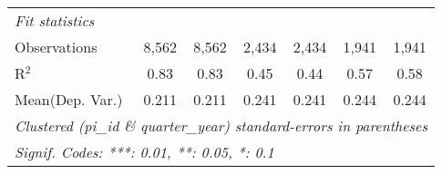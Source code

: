 \begin{tabular}{lcccccc}
   \emph{Fit statistics}\\
   Observations                                                & 8,562         & 8,562         & 2,434         & 2,434         & 1,941        & 1,941\\  
   R$^2$                                                       & 0.83          & 0.83          & 0.45          & 0.44          & 0.57         & 0.58\\  
Mean(Dep. Var.) & 0.211 & 0.211 & 0.241 & 0.241 & 0.244 & 0.244 \\
   \midrule \midrule
   \multicolumn{7}{l}{\emph{Clustered (pi\_id \& quarter\_year) standard-errors in parentheses}}\\
   \multicolumn{7}{l}{\emph{Signif. Codes: ***: 0.01, **: 0.05, *: 0.1}}\\
\end{tabular}
\par\endgroup
